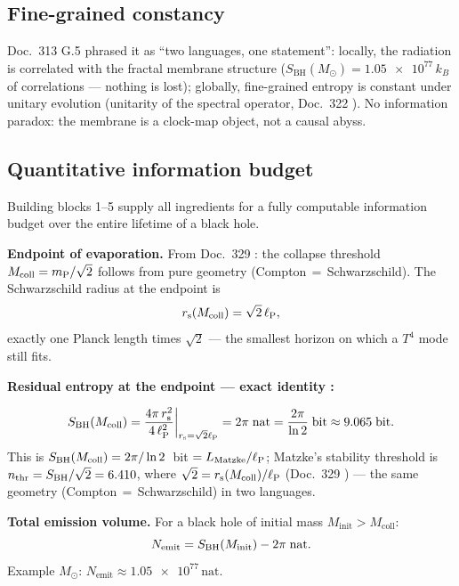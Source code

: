\subsection{Fine-grained constancy}

Doc.\ 313 G.5 phrased it as \enquote{two languages, one statement}:
locally, the radiation is correlated with the fractal membrane
structure ($S_{\mathrm{BH}}(M_\odot) = \num{1.05e77}\,k_B$ of
correlations — nothing is lost); globally, fine-grained entropy is
constant under unitary evolution (unitarity of the spectral operator,
Doc.\ 322 \K). No information paradox: the membrane is a clock-map
object, not a causal abyss.

\subsection{Quantitative information budget \B}
\label{sec:infobilanz}

Building blocks 1--5 supply all ingredients for a fully computable
information budget over the entire lifetime of a black hole.

\textbf{Endpoint of evaporation.}
From Doc.~329 \B: the collapse threshold $M_{\mathrm{coll}} = m_{\mathrm{P}}/\sqrt{2}$
follows from pure geometry (Compton\,$=$\,Schwarzschild).
The Schwarzschild radius at the endpoint is
\begin{equation}
  r_{\mathrm{s}}(M_{\mathrm{coll}}) = \sqrt{2}\,\ell_{\mathrm{P}},
\end{equation}
exactly one Planck length times $\sqrt{2}$ — the smallest horizon on
which a $T^4$ mode still fits.

\textbf{Residual entropy at the endpoint — exact identity \B:}
\begin{tcolorbox}[ffgftbox,title={Main result R93 \B}]
  \begin{equation}
    S_{\mathrm{BH}}(M_{\mathrm{coll}})
    = \frac{4\pi\,r_{\mathrm{s}}^2}{4\,\ell_{\mathrm{P}}^2}\bigg|_{r_{\mathrm{s}}=\sqrt{2}\ell_{\mathrm{P}}}
    = 2\pi \;\text{nat}
    = \frac{2\pi}{\ln 2} \;\text{bit}
    \approx 9.065\;\text{bit}.
  \end{equation}
  This is $S_{\mathrm{BH}}(M_{\mathrm{coll}}) = 2\pi/\ln 2$~bit $= L_{\mathrm{Matzke}}/\ell_{\mathrm{P}}$;
  Matzke's stability threshold is $n_{\mathrm{thr}} = S_{\mathrm{BH}}/\sqrt{2} = 6.410$,
  where $\sqrt{2} = r_{\mathrm{s}}(M_{\mathrm{coll}})/\ell_{\mathrm{P}}$ (Doc.~329 \B) —
  the same geometry (Compton\,$=$\,Schwarzschild) in two languages.
\end{tcolorbox}

\textbf{Total emission volume.} For a black hole of initial mass
$M_{\mathrm{init}} > M_{\mathrm{coll}}$:
\begin{equation}
  N_{\mathrm{emit}}
  = S_{\mathrm{BH}}(M_{\mathrm{init}}) - 2\pi \;\text{nat}.
\end{equation}
Example $M_\odot$: $N_{\mathrm{emit}} \approx \num{1.05e77}\,\text{nat}$.

